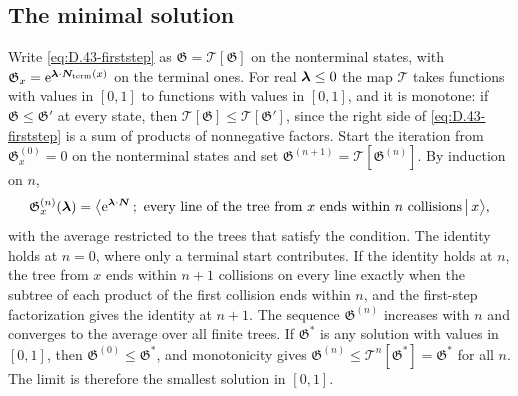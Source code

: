 \subsection{The minimal solution}

Write \cref{eq:D.43-firststep} as $\mathfrak{G} = \mathcal{T}[\mathfrak{G}]$ on the nonterminal states, with $\mathfrak{G}_x = \mathrm{e}^{\bm{\lambda}\cdot\bm{N}_{\mathrm{term}}(x)}$ on the terminal ones. For real $\bm{\lambda} \le 0$ the map $\mathcal{T}$ takes functions with values in $[0, 1]$ to functions with values in $[0, 1]$, and it is monotone: if $\mathfrak{G} \le \mathfrak{G}'$ at every state, then $\mathcal{T}[\mathfrak{G}] \le \mathcal{T}[\mathfrak{G}']$, since the right side of \cref{eq:D.43-firststep} is a sum of products of nonnegative factors. Start the iteration from $\mathfrak{G}^{(0)}_x = 0$ on the nonterminal states and set $\mathfrak{G}^{(n+1)} = \mathcal{T}[\mathfrak{G}^{(n)}]$. By induction on $n$,
\begin{equation*}
  \mathfrak{G}^{(n)}_x(\bm{\lambda}) = \bigl\langle\mathrm{e}^{\bm{\lambda}\cdot\bm{N}}\,;\ \text{every line of the tree from } x \text{ ends within } n \text{ collisions}\,\big|\,x\bigr\rangle ,
\end{equation*}
with the average restricted to the trees that satisfy the condition. The identity holds at $n = 0$, where only a terminal start contributes. If the identity holds at $n$, the tree from $x$ ends within $n + 1$ collisions on every line exactly when the subtree of each product of the first collision ends within $n$, and the first-step factorization gives the identity at $n + 1$. The sequence $\mathfrak{G}^{(n)}$ increases with $n$ and converges to the average over all finite trees. If $\mathfrak{G}^*$ is any solution with values in $[0, 1]$, then $\mathfrak{G}^{(0)} \le \mathfrak{G}^*$, and monotonicity gives $\mathfrak{G}^{(n)} \le \mathcal{T}^n[\mathfrak{G}^*] = \mathfrak{G}^*$ for all $n$. The limit is therefore the smallest solution in $[0, 1]$.


